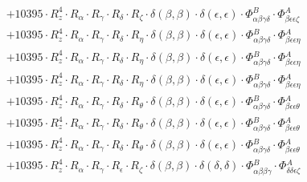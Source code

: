 \documentclass{article}
\begin{document}
\begin{subequations}
\begin{gather}
\begin{array}{c}
 \\[0.2em] 		 + 10395 \cdot R_{z}^{4} \cdot R_{\alpha{}} \cdot R_{\gamma{}} \cdot R_{\delta{}} \cdot R_{\zeta{}} \cdot \delta{}\left(\beta{}, \beta{}\right) \cdot \delta{}\left(\epsilon{}, \epsilon{}\right) \cdot \Phi{}^{B}_{\alpha{}\beta{}\gamma{}\delta{}} \cdot \Phi{}^{A}_{\beta{}\epsilon{}\epsilon{}\zeta{}} 
 \\[0.2em] 		 + 10395 \cdot R_{z}^{4} \cdot R_{\alpha{}} \cdot R_{\gamma{}} \cdot R_{\delta{}} \cdot R_{\eta{}} \cdot \delta{}\left(\beta{}, \beta{}\right) \cdot \delta{}\left(\epsilon{}, \epsilon{}\right) \cdot \Phi{}^{B}_{\alpha{}\beta{}\gamma{}\delta{}} \cdot \Phi{}^{A}_{\beta{}\epsilon{}\epsilon{}\eta{}} 
 \\[0.2em] 		 + 10395 \cdot R_{z}^{4} \cdot R_{\alpha{}} \cdot R_{\gamma{}} \cdot R_{\delta{}} \cdot R_{\eta{}} \cdot \delta{}\left(\beta{}, \beta{}\right) \cdot \delta{}\left(\epsilon{}, \epsilon{}\right) \cdot \Phi{}^{B}_{\alpha{}\beta{}\gamma{}\delta{}} \cdot \Phi{}^{A}_{\beta{}\epsilon{}\epsilon{}\eta{}} 
 \\[0.2em] 		 + 10395 \cdot R_{z}^{4} \cdot R_{\alpha{}} \cdot R_{\gamma{}} \cdot R_{\delta{}} \cdot R_{\eta{}} \cdot \delta{}\left(\beta{}, \beta{}\right) \cdot \delta{}\left(\epsilon{}, \epsilon{}\right) \cdot \Phi{}^{B}_{\alpha{}\beta{}\gamma{}\delta{}} \cdot \Phi{}^{A}_{\beta{}\epsilon{}\epsilon{}\eta{}} 
 \\[0.2em] 		 + 10395 \cdot R_{z}^{4} \cdot R_{\alpha{}} \cdot R_{\gamma{}} \cdot R_{\delta{}} \cdot R_{\theta{}} \cdot \delta{}\left(\beta{}, \beta{}\right) \cdot \delta{}\left(\epsilon{}, \epsilon{}\right) \cdot \Phi{}^{B}_{\alpha{}\beta{}\gamma{}\delta{}} \cdot \Phi{}^{A}_{\beta{}\epsilon{}\epsilon{}\theta{}} 
 \\[0.2em] 		 + 10395 \cdot R_{z}^{4} \cdot R_{\alpha{}} \cdot R_{\gamma{}} \cdot R_{\delta{}} \cdot R_{\theta{}} \cdot \delta{}\left(\beta{}, \beta{}\right) \cdot \delta{}\left(\epsilon{}, \epsilon{}\right) \cdot \Phi{}^{B}_{\alpha{}\beta{}\gamma{}\delta{}} \cdot \Phi{}^{A}_{\beta{}\epsilon{}\epsilon{}\theta{}} 
 \\[0.2em] 		 + 10395 \cdot R_{z}^{4} \cdot R_{\alpha{}} \cdot R_{\gamma{}} \cdot R_{\delta{}} \cdot R_{\theta{}} \cdot \delta{}\left(\beta{}, \beta{}\right) \cdot \delta{}\left(\epsilon{}, \epsilon{}\right) \cdot \Phi{}^{B}_{\alpha{}\beta{}\gamma{}\delta{}} \cdot \Phi{}^{A}_{\beta{}\epsilon{}\epsilon{}\theta{}} 
 \\[0.2em] 		 + 10395 \cdot R_{z}^{4} \cdot R_{\alpha{}} \cdot R_{\gamma{}} \cdot R_{\epsilon{}} \cdot R_{\zeta{}} \cdot \delta{}\left(\beta{}, \beta{}\right) \cdot \delta{}\left(\delta{}, \delta{}\right) \cdot \Phi{}^{B}_{\alpha{}\beta{}\beta{}\gamma{}} \cdot \Phi{}^{A}_{\delta{}\delta{}\epsilon{}\zeta{}} 

\end{array}
\end{gather}
\end{subequations}
\end{document}
